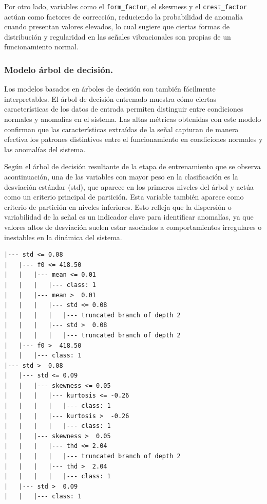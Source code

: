 \documentclass[11pt,a4paper,spanish]{book}
\numberwithin{equation}{chapter}
\numberwithin{figure}{chapter}
\begin{document}
Por otro lado, variables como el \lstinline|form_factor|, el skewness y el 
\lstinline|crest_factor| actúan como factores de corrección, reduciendo la probabilidad 
de anomalía cuando presentan valores elevados, lo cual sugiere que ciertas formas de 
distribución y regularidad en las señales vibracionales son propias de un funcionamiento 
normal. 



\subsubsection{Modelo árbol de decisión.}

Los modelos basados en árboles de decisión son también fácilmente interpretables. 
El árbol de decisión entrenado muestra cómo ciertas características de los datos de 
entrada permiten distinguir entre condiciones normales y anomalías en el sistema. 
Las altas métricas obtenidas con este modelo confirman que las características extraídas 
de la señal capturan de manera efectiva los patrones distintivos entre el funcionamiento 
en condiciones normales y las anomalías del sistema.


Según el árbol de decisión resultante de la etapa de entrenamiento que se observa 
acontinuación, una de las variables con mayor peso en la clasificación es la desviación 
estándar (std), que aparece en los primeros niveles del árbol y actúa como un criterio 
principal de partición. Esta variable también aparece como criterio de partición en 
niveles inferiores. Esto refleja que la dispersión o variabilidad de la señal es un 
indicador clave para identificar anomalías, ya que valores altos de desviación suelen 
estar asociados a comportamientos irregulares o inestables en la dinámica del sistema.

\vspace{5mm}
\begin{lstlisting}[language={}, basicstyle=\ttfamily\footnotesize\color{black}, frame=lines]
|--- std <= 0.08
|   |--- f0 <= 418.50
|   |   |--- mean <= 0.01
|   |   |   |--- class: 1
|   |   |--- mean >  0.01
|   |   |   |--- std <= 0.08
|   |   |   |   |--- truncated branch of depth 2
|   |   |   |--- std >  0.08
|   |   |   |   |--- truncated branch of depth 2
|   |--- f0 >  418.50
|   |   |--- class: 1
|--- std >  0.08
|   |--- std <= 0.09
|   |   |--- skewness <= 0.05
|   |   |   |--- kurtosis <= -0.26
|   |   |   |   |--- class: 1
|   |   |   |--- kurtosis >  -0.26
|   |   |   |   |--- class: 1
|   |   |--- skewness >  0.05
|   |   |   |--- thd <= 2.04
|   |   |   |   |--- truncated branch of depth 2
|   |   |   |--- thd >  2.04
|   |   |   |   |--- class: 1
|   |--- std >  0.09
|   |   |--- class: 1
\end{lstlisting}
\end{document}
